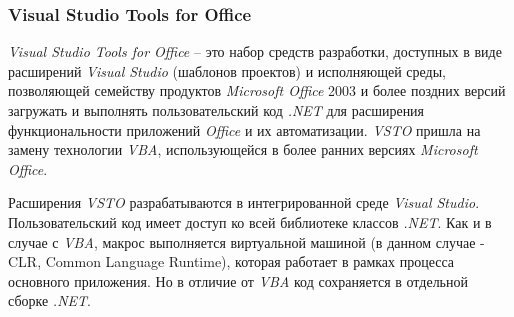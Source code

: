 \subsubsection{Visual Studio Tools for Office}

{\it Visual Studio Tools for Office} -- это набор средств разработки, доступных в виде расширений {\it Visual Studio} (шаблонов проектов) и исполняющей среды, позволяющей  семейству продуктов {\it Microsoft Office} 2003 и более поздних версий загружать и выполнять пользовательский код {\it .NET} для расширения функциональности приложений {\it Office} и их автоматизации. {\it VSTO} пришла на замену технологии {\it VBA}, использующейся в более ранних версиях {\it Microsoft Office}. 

Расширения {\it VSTO} разрабатываются в интегрированной среде {\it Visual Studio}. Пользовательский код имеет доступ ко всей библиотеке классов {\it .NET}. Как и в случае с {\it VBA}, макрос выполняется виртуальной машиной (в данном случае - CLR, Common Language Runtime), которая работает в рамках процесса основного приложения. Но в отличие от {\it VBA} код сохраняется в отдельной сборке {\it .NET}.